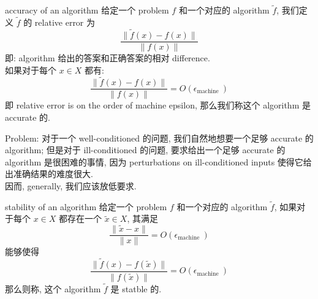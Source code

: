 \begin{definition}{accuracy of an algorithm}
给定一个 problem $f$ 和一个对应的 algorithm $\tilde{f}$, 我们定义 $\tilde{f}$ 的 relative error 为$$
\frac{\|\tilde{f}(x)-f(x)\|}{\|f(x)\|}
$$
  即: algorithm 给出的答案和正确答案的相对 difference.\\
如果对于每个 $x\in X$ 都有: $$
\frac{\|\tilde{f}(x)-f(x)\|}{\|f(x)\|}=O\left(\epsilon_{\text {machine }}\right)
$$
即 relative error is on the order of machine epsilon, 那么我们称这个 algorithm 是 accurate 的.
\end{definition}
Problem: 对于一个 well-conditioned 的问题, 我们自然地想要一个足够 accurate 的 algorithm; 但是对于 ill-conditioned 的问题, 要求给出一个足够 accurate 的 algorithm 是很困难的事情, 因为 perturbations on ill-conditioned inputs 使得它给出准确结果的难度很大.\\
因而, generally, 我们应该放低要求.
\begin{definition}{stability of an algorithm}
    给定一个 problem $f$ 和一个对应的 algorithm $\tilde{f}$, 如果对于每个 $x \in X$ 都存在一个 $\tilde{x} \in X$, 其满足$$
\frac{\|\tilde{x}-x\|}{\|x\|}=O\left(\epsilon_{\text {machine }}\right)
$$能够使得  $$
\frac{\|\tilde{f}(x)-f(\tilde{x})\|}{\|f(\tilde{x})\|}=O\left(\epsilon_{\text {machine }}\right)
$$那么则称, 这个 algorithm $\tilde{f}$ 是 statble 的.
\end{definition}
